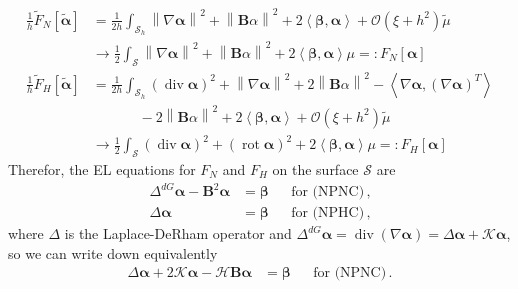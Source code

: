 \documentclass[a4paper,10pt]{scrartcl}
\newcommand{\surf}{\mathcal{S}}
\newcommand{\surfh}{\surf_{h}}
\newcommand{\landau}{\mathcal{O}}
\newcommand{\Bb}{\mathbf{B}}
\newcommand{\alphab}{\bm{\alpha}}
\newcommand{\betab}{\bm{\beta}}
\renewcommand{\div}{\operatorname{div}}
\newcommand{\rot}{\operatorname{rot}}
\newcommand{\talphab}{\tilde{\alphab}}
\newcommand{\tmu}{\tilde{\mu}}
\newcommand{\tF}{\tilde{F}}
\newcommand{\meanc}{\mathcal{H}}
\newcommand{\gaussc}{\mathcal{K}}
\newcommand{\formComma}{\,\text{,}}
\newcommand{\formPeriod}{\,\text{.}}
\begin{document}
      \begin{align}
        \frac{1}{h}\tF_{N}\left[ \talphab \right]
            &= \frac{1}{2h} \int_{\surfh} \left\| \nabla\alphab \right\|^{2} + \left\| \Bb\alpha \right\|^{2} 
                    + 2\left\langle \betab,\alphab \right\rangle + \landau\left( \xi + h^{2} \right)\tmu\\
            &\rightarrow \frac{1}{2}\int_{\surf} \left\| \nabla\alphab \right\|^{2} + \left\| \Bb\alpha \right\|^{2} + 2\left\langle \betab,\alphab \right\rangle\mu
             =: F_{N}\left[ \alphab \right]\\
        \frac{1}{h}\tF_{H}\left[ \talphab \right]
            &= \frac{1}{2h} \int_{\surfh} \left( \div\alphab \right)^{2} 
                                           + \left\| \nabla\alphab \right\|^{2} + 2\left\| \Bb\alpha \right\|^{2} 
                            - \left\langle \nabla\alphab, \left( \nabla\alphab \right)^{T} \right\rangle \\
                            &\hspace{40pt} - 2\left\| \Bb\alpha \right\|^{2} + 2\left\langle \betab,\alphab \right\rangle
                                          + \landau\left( \xi + h^{2} \right)\tmu \\
            &\rightarrow \frac{1}{2}\int_{\surf} \left( \div\alphab \right)^{2} + \left( \rot\alphab \right)^{2} + 2\left\langle \betab,\alphab \right\rangle \mu
            =: F_{H}\left[ \alphab \right]
      \end{align}
      Therefor, the EL equations for \( F_{N} \) and \( F_{H} \) on the surface \( \surf \) are
      \begin{align}
        \Delta^{dG}\alphab - \Bb^{2}\alphab &= \betab &&\text{for (NPNC)} \formComma\\
        \Delta\alphab &= \betab &&\text{for (NPHC)} \formComma
      \end{align}
      where \( \Delta \) is the Laplace-DeRham operator and \( \Delta^{dG}\alphab = \div\left( \nabla\alphab \right) = \Delta\alphab + \gaussc\alphab \),
      so we can write down equivalently 
      \begin{align}
        \Delta\alphab + 2\gaussc\alphab - \meanc\Bb\alphab &= \betab &&\text{for (NPNC)} \formPeriod
      \end{align}
\end{document}
